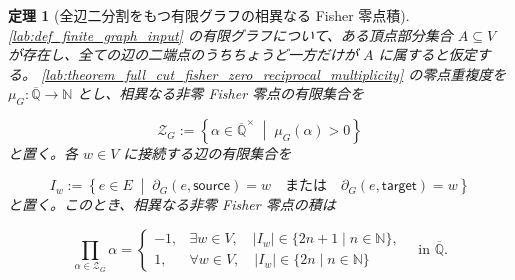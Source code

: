 \documentclass[11pt,a4paper]{article}
\newtheorem{theorem}[definition]{定理}
\theoremstyle{remark}
\begin{document}
\begin{theorem}[全辺二分割をもつ有限グラフの相異なる Fisher 零点積]\label{lab:theorem_full_cut_distinct_fisher_zero_product}
\cref{lab:def_finite_graph_input}
 の有限グラフについて、ある頂点部分集合 
$A\subseteq V$
 が存在し、全ての辺の二端点のうちちょうど一方だけが 
$A$
 に属すると仮定する。
\cref{lab:theorem_full_cut_fisher_zero_reciprocal_multiplicity}
 の零点重複度を 
$\mu_G:\overline{\mathbb Q}\to\mathbb N$
 とし、相異なる非零 Fisher 零点の有限集合を

\[\mathcal Z_G:=
\left\{
  \alpha\in\overline{\mathbb Q}^{\times}
  \;\middle|\;
  \mu_G(\alpha)>0
\right\}\]
と置く。各 
$w\in V$
 に接続する辺の有限集合を

\[I_w:=
\left\{
  e\in E
  \;\middle|\;
  \partial_G(e,\mathsf{source})=w
  \quad\text{または}\quad
  \partial_G(e,\mathsf{target})=w
\right\}\]
と置く。このとき、相異なる非零 Fisher 零点の積は

\[\prod_{\alpha\in\mathcal Z_G}\alpha
=
\begin{cases}
-1,&\exists w\in V,\quad |I_w|\in\{2n+1\mid n\in\mathbb N\},\\
1,&\forall w\in V,\quad |I_w|\in\{2n\mid n\in\mathbb N\}
\end{cases}
\quad\text{in }\overline{\mathbb Q}.\]
\end{theorem}
\end{document}
